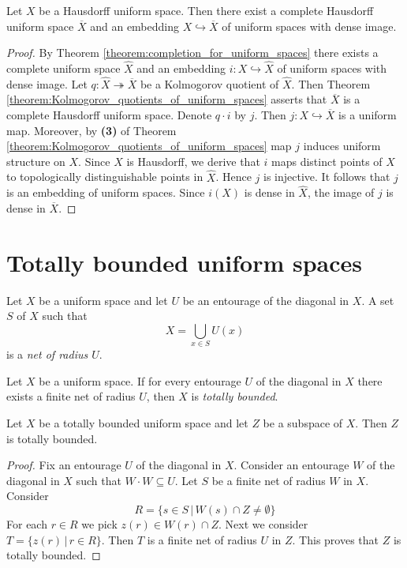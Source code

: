 \begin{corollary}\label{corollary:completion_for_Hausdorff_spaces}
	Let $X$ be a Hausdorff uniform space. Then there exist a complete Hausdorff uniform space $\overline{X}$ and an embedding $X\hookrightarrow \overline{X}$ of uniform spaces with dense image. 
\end{corollary}
\begin{proof}
	By Theorem \ref{theorem:completion_for_uniform_spaces} there exists a complete uniform space $\hat{X}$ and an embedding $i:X\hookrightarrow \hat{X}$ of uniform spaces with dense image. Let $q:\hat{X}\twoheadrightarrow \overline{X}$ be a Kolmogorov quotient of $\hat{X}$. Then Theorem \ref{theorem:Kolmogorov_quotients_of_uniform_spaces} asserts that $\overline{X}$ is a complete Hausdorff uniform space. Denote $q\cdot i$ by $j$. Then $j:X\hookrightarrow \overline{X}$ is a uniform map. Moreover, by \textbf{(3)} of Theorem \ref{theorem:Kolmogorov_quotients_of_uniform_spaces} map $j$ induces uniform structure on $X$. Since $X$ is Hausdorff, we derive that $i$ maps distinct points of $X$ to topologically distinguishable points in $\hat{X}$. Hence $j$ is injective. It follows that $j$ is an embedding of uniform spaces. Since $i(X)$ is dense in $\hat{X}$, the image of $j$ is dense in $\overline{X}$.  
\end{proof}


\section{Totally bounded uniform spaces}

\begin{definition}
	Let $X$ be a uniform space and let $U$ be an entourage of the diagonal in $X$. A set $S$ of $X$ such that
	$$X = \bigcup_{x\in S}U(x)$$
	is a \textit{net of radius $U$}.
\end{definition}

\begin{definition}
	Let $X$ be a uniform space. If for every entourage $U$ of the diagonal in $X$ there exists a finite net of radius $U$, then $X$ is \textit{totally bounded}.
\end{definition}

\begin{theorem}\label{theorem:totally_bounded_is_inherited_by_subspaces}
	Let $X$ be a totally bounded uniform space and let $Z$ be a subspace of $X$. Then $Z$ is totally bounded.
\end{theorem}
\begin{proof}
	Fix an entourage $U$ of the diagonal in $X$. Consider an entourage $W$ of the diagonal in $X$ such that $W\cdot W \subseteq U$. Let $S$ be a finite net of radius $W$ in $X$. Consider
	$$R = \big\{s \in S\,\big|\,W(s)\cap Z \neq \emptyset\big\}$$
	For each $r\in R$ we pick $z(r) \in W(r)\cap Z$. Next we consider $T = \{z(r)\,|\,r\in R\}$. Then $T$ is a finite net of radius $U$ in $Z$. This proves that $Z$ is totally bounded.
\end{proof}

